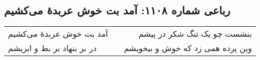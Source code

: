 \begin{center}
\section*{رباعی شماره ۱۱۰۸: آمد بت خوش عربدهٔ می‌کشیم}
\label{sec:1108}
\begin{longtable}{l p{0.5cm} r}
آمد بت خوش عربدهٔ می‌کشیم
&&
بنشست چو یک تنگ شکر در پیشم
\\
در بر بنهاد بر بط و ابریشم
&&
وین پرده همی زد که خوش و بیخویشم
\\
\end{longtable}
\end{center}
